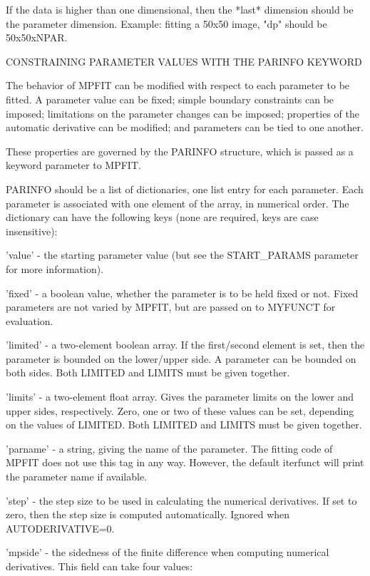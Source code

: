 \begin{DoxyVerb}
 If the data is higher than one dimensional, then the *last*
 dimension should be the parameter dimension.  Example: fitting a
 50x50 image, "dp" should be 50x50xNPAR.


           CONSTRAINING PARAMETER VALUES WITH THE PARINFO KEYWORD

 The behavior of MPFIT can be modified with respect to each
 parameter to be fitted.  A parameter value can be fixed; simple
 boundary constraints can be imposed; limitations on the parameter
 changes can be imposed; properties of the automatic derivative can
 be modified; and parameters can be tied to one another.

 These properties are governed by the PARINFO structure, which is
 passed as a keyword parameter to MPFIT.

 PARINFO should be a list of dictionaries, one list entry for each parameter.
 Each parameter is associated with one element of the array, in
 numerical order.  The dictionary can have the following keys
 (none are required, keys are case insensitive):

    'value' - the starting parameter value (but see the START_PARAMS
 parameter for more information).

    'fixed' - a boolean value, whether the parameter is to be held
 fixed or not.  Fixed parameters are not varied by
 MPFIT, but are passed on to MYFUNCT for evaluation.

    'limited' - a two-element boolean array.  If the first/second
   element is set, then the parameter is bounded on the
   lower/upper side.  A parameter can be bounded on both
   sides.  Both LIMITED and LIMITS must be given
   together.

    'limits' - a two-element float array.  Gives the
  parameter limits on the lower and upper sides,
  respectively.  Zero, one or two of these values can be
  set, depending on the values of LIMITED.  Both LIMITED
  and LIMITS must be given together.

    'parname' - a string, giving the name of the parameter.  The
   fitting code of MPFIT does not use this tag in any
   way.  However, the default iterfunct will print the
   parameter name if available.

    'step' - the step size to be used in calculating the numerical
derivatives.  If set to zero, then the step size is
computed automatically.  Ignored when AUTODERIVATIVE=0.

    'mpside' - the sidedness of the finite difference when computing
  numerical derivatives.  This field can take four
  values:


\end{DoxyVerb}
